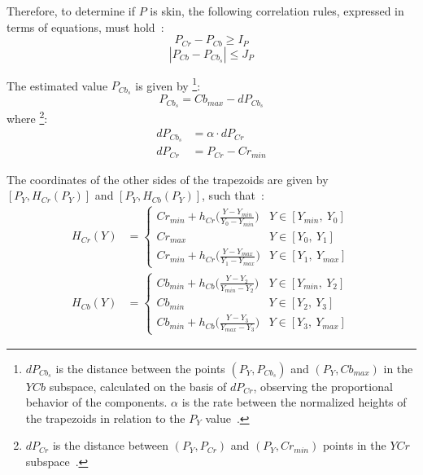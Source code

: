 Therefore, to determine if $P$ is skin, the following correlation rules, expressed in terms of equations, must hold~\citep{brancati:17}:
\begin{equation}
    P_{Cr} - P_{Cb} \geq I_P
\label{condition_c0}
\end{equation}
\begin{equation}
   |P_{Cb} - P_{Cb_s}| \leq J_P
\label{condition_c1}
\end{equation}

The estimated value $P_{Cb_{s}}$ is given by \footnote{$dP_{Cb_{s}}$ is the distance between the points $(P_Y, P_{Cb_{s}})$ and $(P_Y, Cb_{max})$ in the $YCb$ subspace, calculated on the basis of $dP_{Cr}$, observing the proportional behavior of the components. $\alpha$ is the rate between the normalized heights of the trapezoids in relation to the $P_Y$ value~\citep{brancati:17}.}:
\begin{equation}
    P_{Cb_s} = Cb_{max} - dP_{Cb_s}
\end{equation}
where \footnote{$dP_{Cr}$ is the distance between $(P_Y, P_{Cr})$ and $(P_Y, Cr_{min})$ points in the $YCr$ subspace~\citep{brancati:17}.}:
\begin{align}
    dP_{Cb_s} &= \alpha \cdot dP_{Cr}
    \\
    dP_{Cr} &= P_{Cr} - Cr_{min}
\end{align}

The coordinates of the other sides of the trapezoids are given by $[P_Y, H_{Cr}(P_Y)]$ and $[P_Y, H_{Cb}(P_Y)]$, such that~\citep{brancati:17}:
\begin{align}
  H_{Cr}(Y) &=  \begin{cases}
                Cr_{min} + h_{Cr}\big(\frac{Y - Y_{min}}{Y_0 - Y_{min}}\big) & Y \in [Y_{min},\ Y_0] \\
                Cr_{max} & Y \in [Y_0,\ Y_1] \\
                Cr_{min} + h_{Cr}\big(\frac{Y - Y_{max}}{Y_1 - Y_{max}}\big) & Y \in [Y_1,\ Y_{max}]
              \end{cases}
\\
  H_{Cb}(Y) &=  \begin{cases}
                Cb_{min} + h_{Cb}\big(\frac{Y - Y_2}{Y_{min} - Y_2}\big) & Y \in [Y_{min},\ Y_2] \\
                Cb_{min} & Y \in [Y_2,\ Y_3] \\
                Cb_{min} + h_{Cb}\big(\frac{Y - Y_3}{Y_{max} - Y_3}\big) & Y \in [Y_3,\ Y_{max}]
              \end{cases}
\end{align}

